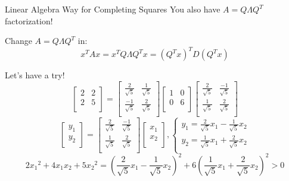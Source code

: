\documentclass{beamer}
\begin{document}
\begin{frame}{Linear Algebra Way for Completing Squares}
    You also have $A=Q\varLambda Q^T$ factorization!

    \vspace{3pt}
    Change $A=Q\varLambda Q^T$ in:
\begin{equation*}
    x^TAx=x^TQ\varLambda Q^Tx=\left( Q^Tx \right) ^TD\left( Q^Tx \right)
\end{equation*}

Let's have a try!
\begin{equation*}
    \left[ \begin{matrix}
        2&		2\\
        2&		5\\
    \end{matrix} \right] =\left[ \begin{matrix}
        \frac{2}{\sqrt{5}}&		\frac{1}{\sqrt{5}}\\
        \frac{-1}{\sqrt{5}}&		\frac{2}{\sqrt{5}}\\
    \end{matrix} \right] \left[ \begin{matrix}
        1&		0\\
        0&		6\\
    \end{matrix} \right] \left[ \begin{matrix}
        \frac{2}{\sqrt{5}}&		\frac{-1}{\sqrt{5}}\\
        \frac{1}{\sqrt{5}}&		\frac{2}{\sqrt{5}}\\
    \end{matrix} \right]
\end{equation*}
\begin{equation*}
    \left[ \begin{array}{c}
        y_1\\
        y_2\\
    \end{array} \right] =\left[ \begin{matrix}
        \frac{2}{\sqrt{5}}&		\frac{-1}{\sqrt{5}}\\
        \frac{1}{\sqrt{5}}&		\frac{2}{\sqrt{5}}\\
    \end{matrix} \right] \left[ \begin{array}{c}
        x_1\\
        x_2\\
    \end{array} \right] , \begin{cases}
        y_1=\frac{2}{\sqrt{5}}x_1-\frac{1}{\sqrt{5}}x_2\\
        y_2=\frac{1}{\sqrt{5}}x_1+\frac{2}{\sqrt{5}}x_2\\
    \end{cases}
\end{equation*}
\begin{equation*}
    2{x_1}^2+4x_1x_2+5{x_2}^2=\left( \frac{2}{\sqrt{5}}x_1-\frac{1}{\sqrt{5}}x_2 \right) ^2+6\left( \frac{1}{\sqrt{5}}x_1+\frac{2}{\sqrt{5}}x_2 \right) ^2>0
\end{equation*}


\end{frame}
\end{document}
